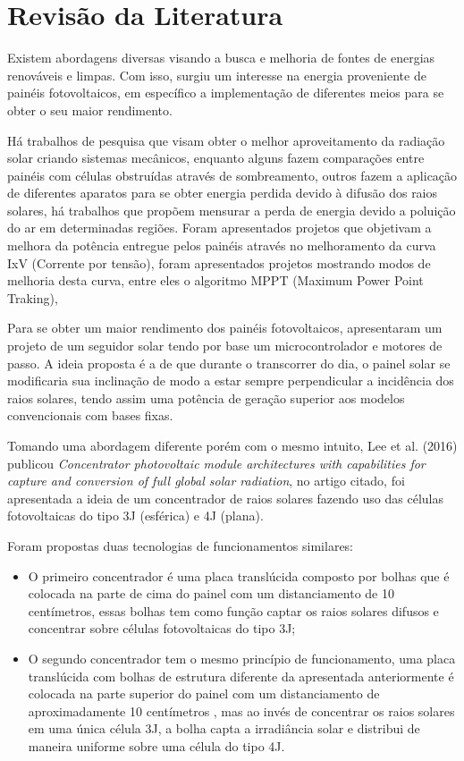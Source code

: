 \chapter{Revisão da Literatura}
\label{cap:02}

Existem abordagens diversas visando a busca e melhoria de fontes de energias renováveis e limpas. Com isso, surgiu um interesse na energia proveniente de painéis fotovoltaicos, em específico a implementação de diferentes meios para se obter o seu maior rendimento.
 
Há trabalhos de pesquisa que visam obter o melhor aproveitamento da radiação solar criando sistemas mecânicos, enquanto alguns fazem comparações entre painéis com células obstruídas através de sombreamento, outros fazem a aplicação de diferentes aparatos para se obter energia perdida devido à difusão dos raios solares, há trabalhos que propõem mensurar a perda de energia devido a poluição do ar em determinadas regiões. Foram apresentados projetos que objetivam a melhora da potência entregue pelos painéis através no melhoramento da curva IxV (Corrente por tensão), foram apresentados projetos mostrando modos de melhoria desta curva, entre eles o algoritmo MPPT (Maximum Power Point Traking), 

Para se obter um maior rendimento dos painéis fotovoltaicos,  apresentaram um projeto de um seguidor solar tendo por base um microcontrolador e motores de passo. A ideia proposta é a de que durante o transcorrer do dia, o painel solar se modificaria sua inclinação de modo a estar sempre perpendicular a incidência dos raios solares, tendo assim uma potência de geração superior aos modelos convencionais com bases fixas.

Tomando uma abordagem diferente porém com o mesmo intuito, Lee et al. (2016) publicou \textit{Concentrator photovoltaic module architectures with capabilities for capture and conversion of full global solar radiation}, no artigo citado, foi apresentada a ideia de um concentrador de raios solares fazendo uso das células fotovoltaicas do tipo 3J (esférica) e 4J (plana). 

Foram propostas duas tecnologias de funcionamentos similares:

\begin{itemize}
	\item O primeiro concentrador é uma placa translúcida composto por bolhas que é colocada na parte de cima do painel com um distanciamento de 10 centímetros, essas bolhas tem como função captar os raios solares difusos e concentrar sobre células fotovoltaicas do tipo 3J;
	\item O segundo concentrador tem o mesmo princípio de funcionamento, uma placa translúcida com bolhas de estrutura diferente da apresentada anteriormente é colocada na parte superior do painel com um distanciamento de aproximadamente 10 centímetros , mas ao invés de concentrar os raios solares em uma única célula 3J, a bolha capta a irradiância solar e distribui de maneira uniforme sobre uma célula do tipo 4J.
\end{itemize}


